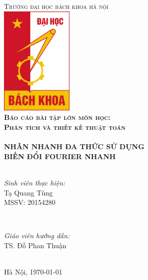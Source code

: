 \documentclass[../report.tex]{subfiles}
\begin{document}
\begin{titlepage}

\center
 
\textsc{\LARGE Trường đại học bách khoa hà nội}\\[1cm] %
\includegraphics[width=3.5cm]{figures/hust.jpg}\\[1cm] %
 
\textsc{\LARGE\bfseries Báo cáo bài tập lớn môn học:} \\[0.2cm]
\textsc{\huge\bfseries Phân tích và thiết kế thuật toán}\\[1cm] %

\HRule \\[0.4cm]
{\LARGE\bfseries NHÂN NHANH ĐA THỨC SỬ DỤNG\\ BIẾN ĐỔI FOURIER NHANH}\\[0.3cm] %
\HRule \\[1.5cm]

\begin{minipage}{0.4\textwidth}
\begin{flushleft} \large
\emph{Sinh viên thực hiện:}\\
Tạ Quang Tùng \\ 
MSSV: 20154280
\end{flushleft}
\end{minipage}
~
\begin{minipage}{0.4\textwidth}
\begin{flushright} \large
\emph{Giáo viên hướng dẫn:} \\
TS. Đỗ Phan Thuận 
\end{flushright}
\end{minipage}\\[5cm]

{\large Hà Nội, \today}\\[1cm] %

\vfill %

\end{titlepage}
\end{document}
